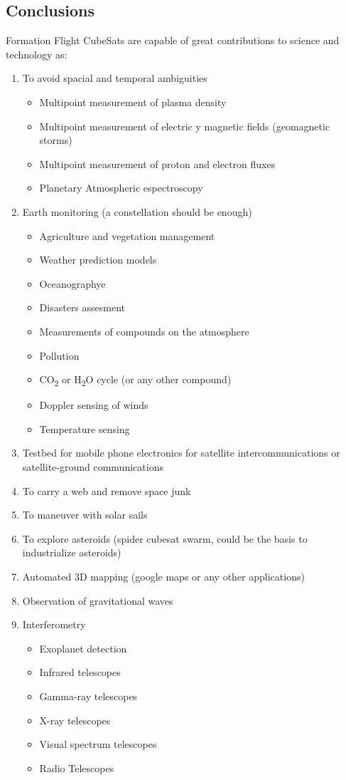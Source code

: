 \subsection{Conclusions}
Formation Flight CubeSats are capable of great contributions to science
and technology as:
\begin{enumerate}
\item To avoid spacial and temporal ambiguities

\begin{itemize}
\item Multipoint measurement of plasma density
\item Multipoint measurement of electric y magnetic fields (geomagnetic
storms)
\item Multipoint measurement of proton and electron fluxes
\item Planetary Atmospheric espectroscopy
\end{itemize}
\item Earth monitoring (a constellation should be enough)

\begin{itemize}
\item Agriculture and vegetation management
\item Weather prediction models
\item Oceanographye
\item Disasters assesment
\item Measurements of compounds on the atmosphere
\item Pollution
\item CO\textsubscript{2} or H\textsubscript{2}O cycle (or any other compound)
\item Doppler sensing of winds
\item Temperature sensing
\end{itemize}
\item Testbed for mobile phone electronics for satellite intercommunications
or satellite-ground communications
\item To carry a web and remove space junk
\item To maneuver with solar sails
\item To explore asteroids (spider cubesat swarm, could be the basis to
industrialize asteroids)
\item Automated 3D mapping (google maps or any other applications)
\item Observation of gravitational waves
\item Interferometry

\begin{itemize}
\item Exoplanet detection
\item Infrared telescopes
\item Gamma-ray telescopes
\item X-ray telescopes
\item Visual spectrum telescopes
\item Radio Telescopes
\end{itemize}
\end{enumerate}